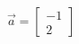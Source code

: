 \documentclass[preview]{standalone}
\begin{document}
\begin{align*}
\vec{a}=\begin{bmatrix}-1\\2\end{bmatrix}
\end{align*}
\end{document}
